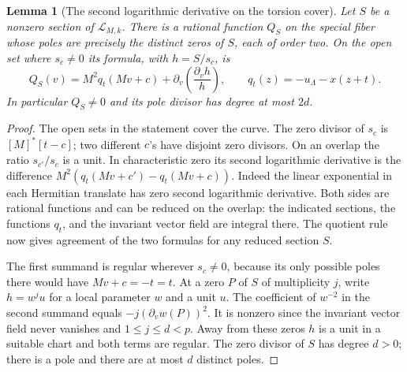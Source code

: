 \documentclass[a4paper,11pt]{article}
\newtheorem{lemma}[proposition]{Lemma}
\theoremstyle{definition}
\theoremstyle{remark}
\numberwithin{equation}{section}
\begin{document}
\begin{lemma}[The second logarithmic derivative on the torsion cover]\leavevmode
\label{lem:curvature482}
Let \(S\) be a nonzero section of \(\mathcal L_{M,k}\).
There is a rational function \(Q_S\) on the special fiber whose
poles are precisely the distinct zeros of \(S\), each of order two.
On the open set where \(s_c\ne0\) its formula, with \(h=S/s_c\),
is
\[
 Q_S(v)=M^2q_t(Mv+c)+
              \partial_v\!\left(\frac{\partial_v h}{h}\right),
 \qquad q_t(z)=-u_\Lambda-x(z+t).
\]
In particular \(Q_S\ne0\) and its pole divisor has degree at most
\(2d\).
\end{lemma}
\begin{proof}
The open sets in the statement cover the curve. The zero divisor
of \(s_c\) is \([M]^*[t-c]\); two different \(c\)'s have disjoint
zero divisors. On an overlap the ratio \(s_{c'}/s_c\) is a unit.
In characteristic zero its second logarithmic derivative is the
difference \(M^2(q_t(Mv+c')-q_t(Mv+c))\). Indeed the linear
exponential in each Hermitian translate has zero second
logarithmic derivative. Both sides are rational functions and
can be reduced on the overlap: the indicated sections,
the functions \(q_t\), and the invariant vector field are
integral there. The quotient rule now gives agreement of the
two formulas for any reduced section \(S\).

The first summand is regular wherever \(s_c\ne0\), because its
only possible poles there would have \(Mv+c=-t=t\).
At a zero \(P\) of \(S\) of multiplicity \(j\), write
\(h=w^j u\) for a local parameter \(w\) and a unit \(u\).
The coefficient of \(w^{-2}\) in the second summand equals
\(-j(\partial_v w(P))^2\). It is nonzero since the invariant
vector field never vanishes and \(1\le j\le d<p\). Away from
these zeros \(h\) is a unit in a suitable chart and both terms
are regular. The zero divisor of \(S\) has degree \(d>0\);
there is a pole and there are at most \(d\) distinct poles.
\end{proof}
\end{document}

